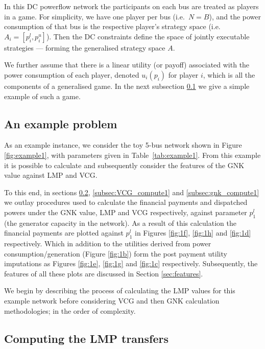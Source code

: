 In this DC powerflow network the participants on each bus are treated as players in a game.
For simplicity, we have one player per bus (i.e.~$N=B$), and the power consumption of that bus is the respective player's strategy space (i.e.\ $A_i=[p_i^l,p_i^u]$).
Then the DC constraints define the space of jointly executable strategies --- forming the generalised strategy space $A$.

We further assume that there is a linear utility (or payoff) associated with the power consumption of each player, denoted $u_i(p_i)$ for player $i$, which is all the components of a generalised game.
In the next subsection \ref{sec:example_network} we give a simple example of such a game.



\subsection{An example problem}\label{sec:example_network}

As an example instance, we consider the toy 5-bus network shown in Figure \ref{fig:example1}, with parameters given in Table~\ref{tab:example1}.
From this example it is possible to calculate and subsequently consider the features of the GNK value against LMP and VCG.

To this end, in sections \ref{subsec:LMP_compute1}, \ref{subsec:VCG_compute1} and \ref{subsec:gnk_compute1} we outlay procedures used to calculate the financial payments and dispatched powers under the GNK value, LMP and VCG respectively, against parameter $p_1^l$ (the generator capacity in the network).
As a result of this calculation the financial payments are plotted against $p_1^l$ in Figures \ref{fig:1f}, \ref{fig:1h} and \ref{fig:1d} respectively. Which in addition to the utilities derived from power consumption/generation (Figure \ref{fig:1b}) form the post payment utility imputations as Figures \ref{fig:1e}, \ref{fig:1g} and \ref{fig:1c} respectively.
Subsequently, the features of all these plots are discussed in Section \ref{sec:features}.

We begin by describing the process of calculating the LMP values for this example network before considering VCG and then GNK calculation methodologies; in the order of complexity.





\subsection{Computing the LMP transfers}\label{subsec:LMP_compute1}

